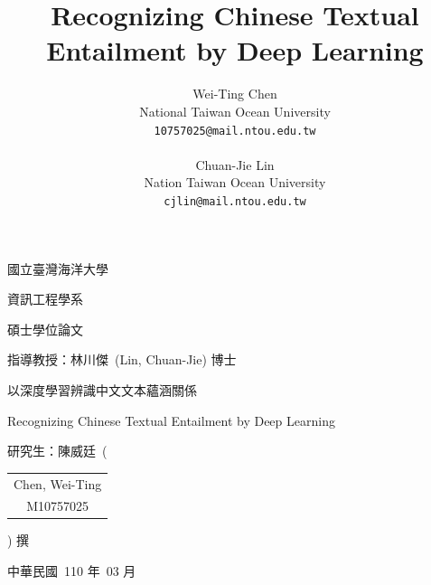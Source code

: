 \documentclass[12pt]{article}
\title{Recognizing Chinese Textual Entailment by Deep Learning}
\author{
  Wei-Ting Chen\\
  National Taiwan Ocean University\\
  \texttt{10757025@mail.ntou.edu.tw}\\
  \\
  Chuan-Jie Lin\\
  Nation Taiwan Ocean University\\
  \texttt{cjlin@mail.ntou.edu.tw}\\
}
\begin{document}
  \begin{CJK*}{UTF8}{bkai}

  \begin{titlepage}
  \centering
  {\Huge 國立臺灣海洋大學\par}
  \vspace{1cm}
  {\huge 資訊工程學系\par}
  \vspace{1cm}
  {\huge 碩士學位論文\par}
  \vspace{2cm}
  {\LARGE 指導教授：林川傑\ (Lin, Chuan-Jie) 博士\par}
  \vfill
  {\LARGE 以深度學習辨識中文文本蘊涵關係\par}
  {\LARGE Recognizing Chinese Textual Entailment by Deep Learning\par}
  \vfill
  {\LARGE 研究生：陳威廷\ \bigg(
    \begin{tabular}{c}
      Chen, Wei-Ting \\
      M10757025
    \end{tabular}
    \bigg) 撰}
    \vfill
    {\LARGE 中華民國\ 110 年\ 03 月}
  \end{titlepage}


\end{CJK*}
\end{document}
